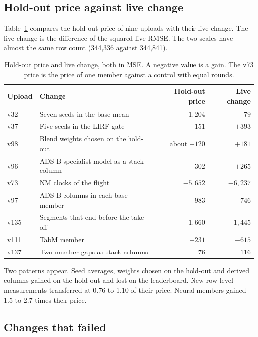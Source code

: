 \documentclass[
  manuscript=article,
  layout=preprint,
  year=2026,
  volume=x,
]{extra/joas}
\begin{document}
\subsection{Hold-out price against live change}

Table~\ref{tb:transfer} compares the hold-out price of nine uploads with their live change. The live change is the difference of the squared live RMSE. The two scales have almost the same row count (344,336 against 344,841).

\begin{table}[htbp!]
  \centering
  \small
  \caption{Hold-out price and live change, both in MSE. A negative value is a gain. The v73 price is the price of one member against a control with equal rounds.}
  \label{tb:transfer}
  \begin{tabular}{llrr}
  \toprule
  \textbf{Upload} & \textbf{Change} & \textbf{Hold-out price} & \textbf{Live change} \\
  \midrule
  v32 & Seven seeds in the base mean & $-1{,}204$ & $+79$ \\
  v37 & Five seeds in the LIRF gate & $-151$ & $+393$ \\
  v98 & Blend weights chosen on the hold-out & about $-120$ & $+181$ \\
  v96 & ADS-B specialist model as a stack column & $-302$ & $+265$ \\
  v73 & NM clocks of the flight & $-5{,}652$ & $-6{,}237$ \\
  v97 & ADS-B columns in each base member & $-983$ & $-746$ \\
  v135 & Segments that end before the take-off & $-1{,}660$ & $-1{,}445$ \\
  v111 & TabM member & $-231$ & $-615$ \\
  v137 & Two member gaps as stack columns & $-76$ & $-116$ \\
  \bottomrule
  \end{tabular}
\end{table}

Two patterns appear. Seed averages, weights chosen on the hold-out and derived columns gained on the hold-out and lost on the leaderboard. New row-level measurements transferred at 0.76 to 1.10 of their price. Neural members gained 1.5 to 2.7 times their price.

\subsection{Changes that failed}
\end{document}
